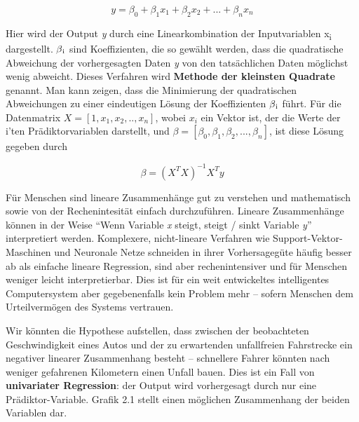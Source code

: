 \begin{equation*}
y = \beta_0 + \beta_1 x_1 + \beta_2 x_2 + ... + \beta_n x_n
\end{equation*}

Hier wird der Output \emph{y} durch eine Linearkombination der Inputvariablen
x\textsubscript{i} dargestellt. $\beta \textsubscript{i}$ sind Koeffizienten, die so
gewählt werden, dass die quadratische Abweichung der vorhergesagten Daten \emph{y}
von den tatsächlichen Daten möglichst wenig abweicht. Dieses Verfahren wird
\textbf{Methode der kleinsten Quadrate} genannt. Man kann zeigen, dass die
Minimierung der quadratischen Abweichungen zu einer eindeutigen Lösung der
Koeffizienten $\beta \textsubscript{i}$ führt. Für die Datenmatrix $X = [1, x_1, x_2,
  .., x_n]$, wobei $x_i$ ein Vektor ist, der die Werte der i'ten Prädiktorvariablen
darstellt, und $\beta = [\beta_0, \beta_1, \beta_2, ..., \beta_n]$, ist diese Lösung
gegeben durch

\begin{equation*}
\beta = (X^TX)^{-1}X^Ty
\end{equation*}

Für Menschen sind lineare Zusammenhänge gut zu verstehen und mathematisch sowie von
der Rechenintesität einfach durchzuführen. Lineare Zusammenhänge können in der Weise
``Wenn Variable \emph{x} steigt, steigt / sinkt Variable \emph{y}'' interpretiert
werden. Komplexere, nicht-lineare Verfahren wie Support-Vektor-Maschinen und
Neuronale Netze schneiden in ihrer Vorhersagegüte häufig besser ab als einfache
lineare Regression, sind aber rechenintensiver und für Menschen weniger leicht
interpretierbar. Dies ist für ein weit entwickeltes intelligentes Computersystem aber
gegebenenfalls kein Problem mehr -- sofern Menschen dem Urteilvermögen des Systems
vertrauen.

Wir könnten die Hypothese aufstellen, dass zwischen der beobachteten Geschwindigkeit
eines Autos und der zu erwartenden unfallfreien Fahrstrecke ein negativer linearer
Zusammenhang besteht -- schnellere Fahrer könnten nach weniger gefahrenen Kilometern
einen Unfall bauen. Dies ist ein Fall von \textbf{univariater Regression}: der Output
wird vorhergesagt durch nur eine Prädiktor-Variable. Grafik 2.1 stellt einen
möglichen Zusammenhang der beiden Variablen dar.

